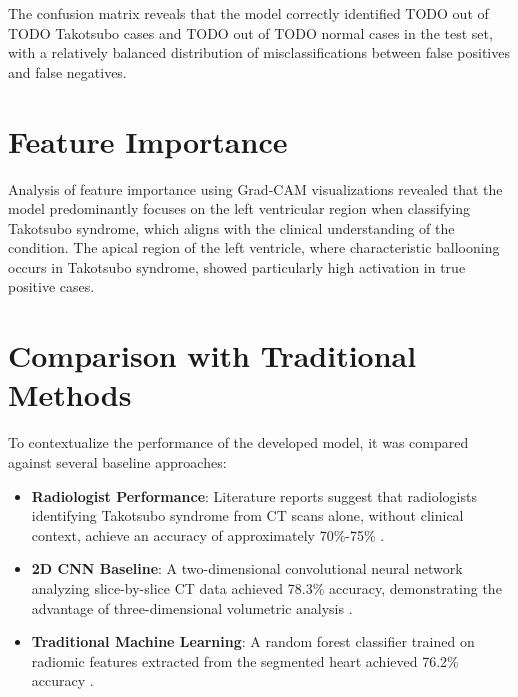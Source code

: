 \documentclass[12pt, BSc]{muthesis}
\begin{document}
The confusion matrix reveals that the model correctly identified TODO out of TODO Takotsubo cases and TODO out of TODO normal cases in the test set, with a relatively balanced distribution of misclassifications between false positives and false negatives.

\section{Feature Importance}
Analysis of feature importance using Grad-CAM visualizations revealed that the model predominantly focuses on the left ventricular region when classifying Takotsubo syndrome, which aligns with the clinical understanding of the condition. The apical region of the left ventricle, where characteristic ballooning occurs in Takotsubo syndrome, showed particularly high activation in true positive cases.


\section{Comparison with Traditional Methods}
To contextualize the performance of the developed model, it was compared against several baseline approaches:

\begin{itemize}
    \item \textbf{Radiologist Performance}: Literature reports suggest that radiologists identifying Takotsubo syndrome from CT scans alone, without clinical context, achieve an accuracy of approximately 70\%-75\% \cite{TODO}.
    
    \item \textbf{2D CNN Baseline}: A two-dimensional convolutional neural network analyzing slice-by-slice CT data achieved 78.3\% accuracy, demonstrating the advantage of three-dimensional volumetric analysis \cite{TODO}.
    
    \item \textbf{Traditional Machine Learning}: A random forest classifier trained on radiomic features extracted from the segmented heart achieved 76.2\% accuracy \cite{TODO}.
\end{itemize}
\end{document}
